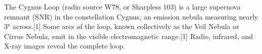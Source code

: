 The Cygnus Loop (radio source W78, or Sharpless 103) is a large supernova remnant (SNR) in the constellation Cygnus, an emission nebula measuring nearly 3° across.[1] Some arcs of the loop, known collectively as the Veil Nebula or Cirrus Nebula, emit in the visible electromagnetic range.[1] Radio, infrared, and X-ray images reveal the complete loop.
